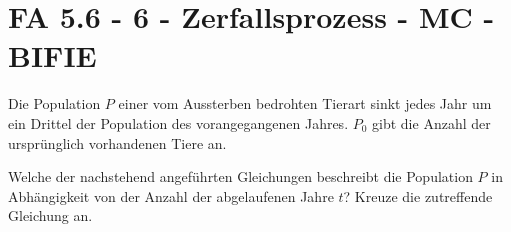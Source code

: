 \section{FA 5.6 - 6 - Zerfallsprozess - MC - BIFIE}

\begin{beispiel}[FA 5.6]{1} %
Die Population $P$ einer vom Aussterben bedrohten Tierart sinkt jedes Jahr um ein Drittel der Population des vorangegangenen Jahres. $P_0$ gibt die Anzahl der ursprünglich vorhandenen Tiere an.

Welche der nachstehend angeführten Gleichungen beschreibt die Population $P$ in Abhängigkeit von der Anzahl der abgelaufenen Jahre $t$? Kreuze die zutreffende Gleichung an.

\end{beispiel}